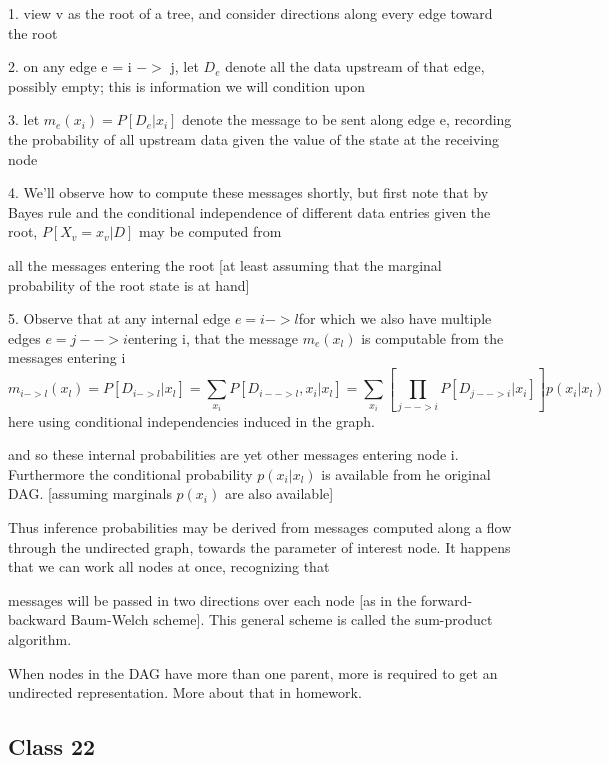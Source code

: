 \documentclass[11pt,a4paper]{article}
\begin{document}
	1.  view v as the root of a tree, and consider directions along every edge toward the root
	
	2.  on any edge e = i $->$ j, let $D_e$ denote all the data upstream of that edge, possibly empty; this is information we will condition upon
	
	3.  let $ m_e (x_i) = P[ D_e | x_i ] $ denote the message to be sent along edge e, recording the probability of all upstream data given the value of the state at the receiving node
	
	4.  We'll observe how to compute these messages shortly, but first note that by Bayes rule and the conditional independence of different data entries given the root,  $P[ X_v = x_v | D ]$ may be computed from
	
	all the messages entering the root [at least assuming that the marginal probability of the root state is at hand]
	
	5. Observe that at any internal edge $e = { i -> l } $for which we also have multiple edges $e = {j --> i} $entering i, that the message $m_e( x_l)$ is computable from the messages entering i
	\begin{equation}
	m_{i->l}( x_l ) = P[ D_{i->l} | x_l ] = \sum_{x_i}  P[ D_{i-->l} , x_i | x_l ]  = \sum_{x_i} [ \prod_{j -->i} P[ D_{j -->i} | x_i ]    ] p( x_i | x_l )
	\end{equation}
		  here using conditional independencies induced in the graph.
	
	and so these internal probabilities are yet other messages entering node i.   Furthermore the conditional probability $p(x_i|x_l)$  is available from he original DAG. [assuming marginals $p(x_i)$ are also available]  
	
	Thus inference probabilities may be derived from messages computed along a flow through the undirected graph, towards the parameter of interest node.    It happens that we can work all nodes at once, recognizing that
	
	messages will be passed in two directions over each node [as in the forward-backward Baum-Welch scheme]. This general scheme is called the sum-product algorithm.
	
	When nodes in the DAG have more than one parent, more is required to get an undirected representation.   More about that in homework.
	
\subsection*{Class 22}	
\end{document}
